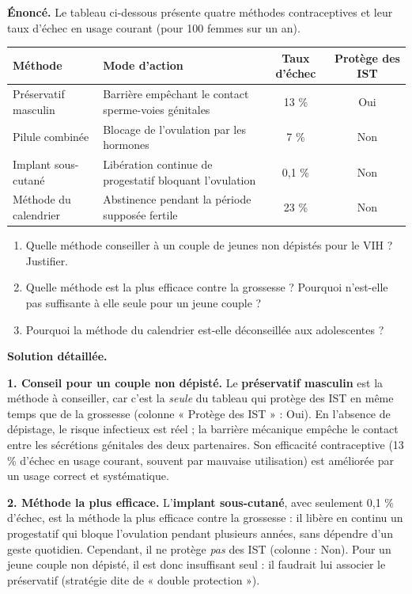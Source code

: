 \documentclass[11pt]{article}
\begin{document}
\begin{exoresolu}
\textbf{Énoncé.} Le tableau ci-dessous présente quatre méthodes contraceptives et leur taux d'échec en usage courant (pour 100 femmes sur un an).

\begin{center}
\begin{tabularx}{\linewidth}{|l|X|c|c|}
\hline
\rowcolor{popblueL} \textbf{Méthode} & \textbf{Mode d'action} & \textbf{Taux d'échec} & \textbf{Protège des IST} \\
\hline
Préservatif masculin & Barrière empêchant le contact sperme-voies génitales & 13 \% & Oui \\
\hline
Pilule combinée & Blocage de l'ovulation par les hormones & 7 \% & Non \\
\hline
Implant sous-cutané & Libération continue de progestatif bloquant l'ovulation & 0,1 \% & Non \\
\hline
Méthode du calendrier & Abstinence pendant la période supposée fertile & 23 \% & Non \\
\hline
\end{tabularx}
\end{center}

\begin{enumerate}
\item Quelle méthode conseiller à un couple de jeunes non dépistés pour le VIH ? Justifier.
\item Quelle méthode est la plus efficace contre la grossesse ? Pourquoi n'est-elle pas suffisante à elle seule pour un jeune couple ?
\item Pourquoi la méthode du calendrier est-elle déconseillée aux adolescentes ?
\end{enumerate}
\tcblower
\textbf{Solution détaillée.}

\textbf{1. Conseil pour un couple non dépisté.} Le \textbf{préservatif masculin} est la méthode à conseiller, car c'est la \emph{seule} du tableau qui protège des IST en même temps que de la grossesse (colonne « Protège des IST » : Oui). En l'absence de dépistage, le risque infectieux est réel ; la barrière mécanique empêche le contact entre les sécrétions génitales des deux partenaires. Son efficacité contraceptive (13 \% d'échec en usage courant, souvent par mauvaise utilisation) est améliorée par un usage correct et systématique.

\textbf{2. Méthode la plus efficace.} L'\textbf{implant sous-cutané}, avec seulement 0,1 \% d'échec, est la méthode la plus efficace contre la grossesse : il libère en continu un progestatif qui bloque l'ovulation pendant plusieurs années, sans dépendre d'un geste quotidien. Cependant, il ne protège \emph{pas} des IST (colonne : Non). Pour un jeune couple non dépisté, il est donc insuffisant seul : il faudrait lui associer le préservatif (stratégie dite de « double protection »).


\end{exoresolu}
\end{document}
